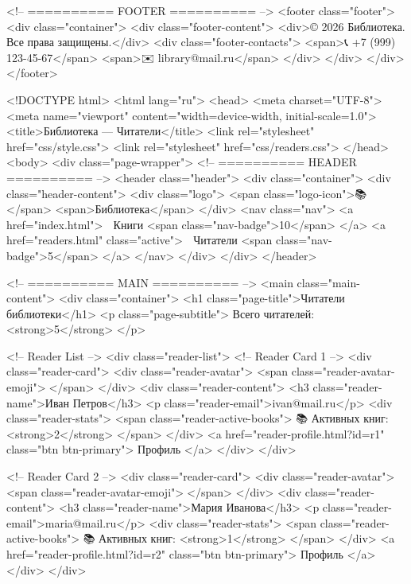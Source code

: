     <!-- ========== FOOTER ========== -->
    <footer class="footer">
      <div class="container">
        <div class="footer-content">
          <div>© 2026 Библиотека. Все права защищены.</div>
          <div class="footer-contacts">
            <span>📞 +7 (999) 123-45-67</span>
            <span>✉️ library@mail.ru</span>
          </div>
        </div>
      </div>
    </footer>
 

    <!DOCTYPE html>
<html lang="ru">
<head>
  <meta charset="UTF-8">
  <meta name="viewport" content="width=device-width, initial-scale=1.0">
  <title>Библиотека — Читатели</title>
  <link rel="stylesheet" href="css/style.css">
  <link rel="stylesheet" href="css/readers.css">
</head>
<body>
  <div class="page-wrapper">
    <!-- ========== HEADER ========== -->
    <header class="header">
      <div class="container">
        <div class="header-content">
          <div class="logo">
            <span class="logo-icon">📚</span>
            <span>Библиотека</span>
          </div>
          <nav class="nav">
            <a href="index.html">
              📖 Книги
              <span class="nav-badge">10</span>
            </a>
            <a href="readers.html" class="active">
              👤 Читатели
              <span class="nav-badge">5</span>
            </a>
          </nav>
        </div>
      </div>
    </header>

    <!-- ========== MAIN ========== -->
    <main class="main-content">
      <div class="container">
        <h1 class="page-title">Читатели библиотеки</h1>
        <p class="page-subtitle">
          Всего читателей: <strong>5</strong>
        </p>

        <!-- Reader List -->
        <div class="reader-list">
          <!-- Reader Card 1 -->
          <div class="reader-card">
            <div class="reader-avatar">
              <span class="reader-avatar-emoji">👤</span>
            </div>
            <div class="reader-content">
              <h3 class="reader-name">Иван Петров</h3>
              <p class="reader-email">ivan@mail.ru</p>
              <div class="reader-stats">
                <span class="reader-active-books">
                  📚 Активных книг: <strong>2</strong>
                </span>
              </div>
              <a href="reader-profile.html?id=r1" class="btn btn-primary">
                Профиль
              </a>
            </div>
          </div>

          <!-- Reader Card 2 -->
          <div class="reader-card">
            <div class="reader-avatar">
              <span class="reader-avatar-emoji">👤</span>
            </div>
            <div class="reader-content">
              <h3 class="reader-name">Мария Иванова</h3>
              <p class="reader-email">maria@mail.ru</p>
              <div class="reader-stats">
                <span class="reader-active-books">
                  📚 Активных книг: <strong>1</strong>
                </span>
              </div>
              <a href="reader-profile.html?id=r2" class="btn btn-primary">
                Профиль
              </a>
            </div>
          </div>

